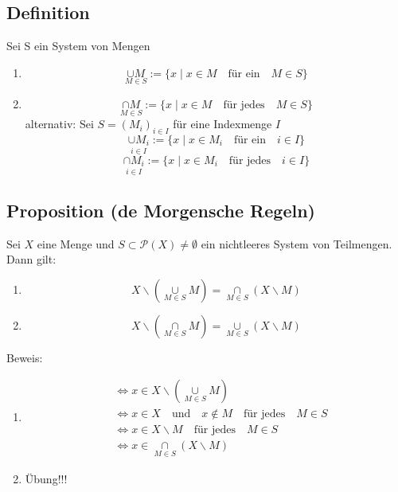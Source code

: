 \subsection{Definition}
Sei S ein  System von Mengen
\begin{enumerate}
\item 
\begin{displaymath}
\underset{M \in S}{\cup M} := \{ x \mid x \in M \quad \mbox{für ein} \quad M \in S \}
\end{displaymath}

\item 
\[  \underset {M \in S}{\cap M} := \{  x \mid x \in M \quad \mbox{für jedes} \quad M \in S\}  \]
alternativ: Sei \(S=(M_i)_{i \in I} \) für eine Indexmenge \(I\)
\[ \underset{i \in I}{\cup M_i} := \{x \mid x \in M_i \quad \mbox{für ein} \quad i \in I\} \]
\[ \underset{i \in I}{\cap M_i} := \{x\mid x\in M_i \quad \mbox{für jedes} \quad i\in I \} \]

\end{enumerate}

\subsection{Proposition (de Morgensche Regeln)}
Sei \(X\) eine Menge und \( S \subset \mathcal{P} (X)\not= \emptyset \) ein nichtleeres System von Teilmengen.
Dann gilt:
\begin{enumerate}
\item \[ X \backslash ( \underset{M\in S}{\cup } M ) = \underset{M \in S}{\cap}(X \backslash M) \]
\item \[ X \backslash ( \underset{M \in S}{\cap} M) = \underset{M \in S}{\cup}(X \backslash M) \]
\end{enumerate}
Beweis: 
\begin{enumerate}
\item 
\begin{align*}
&\Leftrightarrow x \in X \backslash (\underset{M \in S}{\cup} M)\\ 
&\Leftrightarrow x \in  X \quad \mbox{und} \quad x \not\in M \quad \mbox{für jedes} \quad M \in S \\
&\Leftrightarrow x \in X \backslash M \quad \text{für jedes} \quad M \in S \\
&\Leftrightarrow x \in \underset{M \in S}{\cap} (X \backslash M)
\end{align*}

\item Übung!!!
\end{enumerate}

